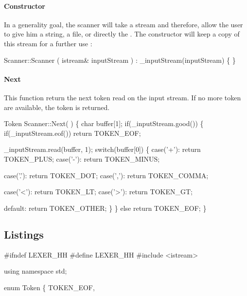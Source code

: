\paragraph{Constructor} 
In a generality goal, the scanner will take a stream and therefore, allow the user to give him a string, a file, or directly the . The constructor will keep a copy of this stream for a further use :

\nwenddocs{}\endmoddef\nwstartdeflinemarkup\nwenddeflinemarkup
Scanner::Scanner ( istream& inputStream ) 
: _inputStream(inputStream)
\{ \}
\nwendcode{}\nwdocspar

\paragraph{Next}
This function return the next token read on the input stream. If no more token are available, the token  is returned.

\nwenddocs{}\endmoddef\nwstartdeflinemarkup\nwenddeflinemarkup
Token Scanner::Next( ) \{
        char buffer[1];
        if(_inputStream.good()) \{
                if(_inputStream.eof()) return TOKEN_EOF;

                _inputStream.read(buffer, 1);
                switch(buffer[0]) \{
                        case('+'): return TOKEN_PLUS;
                        case('-'): return TOKEN_MINUS;
                                   
                        case('.'): return TOKEN_DOT;
                        case(','): return TOKEN_COMMA;

                        case('<'): return TOKEN_LT;
                        case('>'): return TOKEN_GT;

                        default: return TOKEN_OTHER;
                \}
        \} else return TOKEN_EOF;
\}
\nwendcode{}\nwdocspar

\subsection{Listings}
\nwenddocs{}\endmoddef\nwstartdeflinemarkup\nwenddeflinemarkup
#ifndef LEXER_HH
#define LEXER_HH
#include <istream>

using namespace std;

enum Token \{
        TOKEN_EOF,

